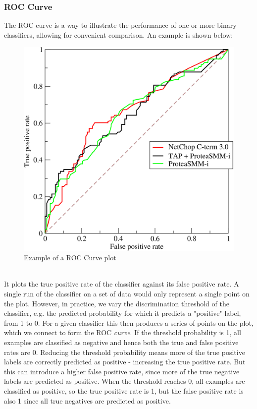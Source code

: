 \documentclass[11pt]{article} %
\theoremstyle{plain}
\theoremstyle{definition}
\begin{document}
\subsubsection{ROC Curve}
The ROC curve is a way to illustrate the performance of one or more binary classifiers, allowing for convenient comparison. An example \cite{wiki:ROC_Curve} is shown below:  
\begin{figure}[!ht]
  \centering    
  \caption{Example of a ROC Curve plot}
  \label{fig:ROC_Curve}
  \includegraphics[scale=2]{ROC_Curve.png}
\end{figure}
\\
\noindent
It plots the true positive rate of the classifier against its false positive rate. A single run of the classifier on a set of data would only represent a single point on the plot. However, in practice, we vary the discrimination threshold of the classifier, e.g. the predicted probability for which it predicts a "positive" label, from 1 to 0. For a given classifier this then produces a series of points on the plot, which we connect to form the ROC \textit{curve}. If the threshold probability is 1, all examples are classified as negative and hence both the true and false positive rates are 0. Reducing the threshold probability means more of the true positive labels are correctly predicted as positive - increasing the true positive rate. But this can introduce a higher false positive rate, since more of the true negative labels are predicted as positive. When the threshold reaches 0, all examples are classified as positive, so the true positive rate is 1, but the false positive rate is also 1 since all true negatives are predicted as positive. 
\end{document}
